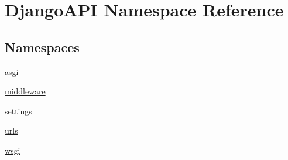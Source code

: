\hypertarget{namespace_django_a_p_i}{}\section{Django\+A\+PI Namespace Reference}
\label{namespace_django_a_p_i}
\subsection*{Namespaces}
\begin{DoxyCompactItemize}
\item 
 \hyperlink{namespace_django_a_p_i_1_1asgi}{asgi}
\item 
 \hyperlink{namespace_django_a_p_i_1_1middleware}{middleware}
\item 
 \hyperlink{namespace_django_a_p_i_1_1settings}{settings}
\item 
 \hyperlink{namespace_django_a_p_i_1_1urls}{urls}
\item 
 \hyperlink{namespace_django_a_p_i_1_1wsgi}{wsgi}
\end{DoxyCompactItemize}
